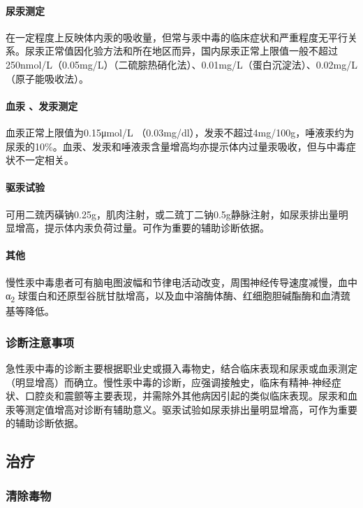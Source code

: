 \paragraph{尿汞测定}

在一定程度上反映体内汞的吸收量，但常与汞中毒的临床症状和严重程度无平行关系。尿汞正常值因化验方法和所在地区而异，国内尿汞正常上限值一般不超过250nmol/L（0.05mg/L）（二硫腙热硝化法）、0.01mg/L（蛋白沉淀法）、0.02mg/L（原子能吸收法）。

\paragraph{血汞 、发汞测定}

血汞正常上限值为0.15μmol/L
（0.03mg/dl），发汞不超过4mg/100g，唾液汞约为尿汞的10\%。血汞、发汞和唾液汞含量增高均亦提示体内过量汞吸收，但与中毒症状不一定相关。

\paragraph{驱汞试验}

可用二巯丙磺钠0.25g，肌肉注射，或二巯丁二钠0.5g静脉注射，如尿汞排出量明显增高，提示体内汞负荷过量。可作为重要的辅助诊断依据。

\paragraph{其他}

慢性汞中毒患者可有脑电图波幅和节律电活动改变，周围神经传导速度减慢，血中α\textsubscript{2}
球蛋白和还原型谷胱甘肽增高，以及血中溶酶体酶、红细胞胆碱酯酶和血清巯基等降低。

\subsubsection{诊断注意事项}

急性汞中毒的诊断主要根据职业史或摄入毒物史，结合临床表现和尿汞或血汞测定（明显增高）而确立。慢性汞中毒的诊断，应强调接触史，临床有精神-神经症状、口腔炎和震颤等主要表现，并需除外其他病因引起的类似临床表现。尿汞和血汞等测定值增高对诊断有辅助意义。驱汞试验如尿汞排出量明显增高，可作为重要的辅助诊断依据。

\subsection{治疗}

\subsubsection{清除毒物}

